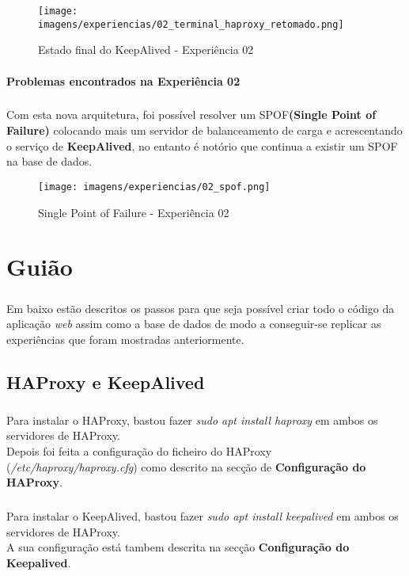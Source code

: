 \documentclass{report}
\begin{document}
\begin{figure}[H]
\center
\texttt{[image: imagens/experiencias/02\_terminal\_haproxy\_retomado.png]}
\caption{Estado final do KeepAlived - Experiência 02}
\label{fig.nav}
\end{figure}

\subsubsection{Problemas encontrados na Experiência 02}
\paragraph{}
Com esta nova arquitetura, foi possível resolver um SPOF\textbf{(Single Point of Failure)} colocando mais um servidor de balanceamento de carga e acrescentando o serviço de \textbf{KeepAlived}, no entanto é notório que continua a existir um SPOF na base de dados.

\begin{figure}[H]
\center
\texttt{[image: imagens/experiencias/02\_spof.png]}
\caption{Single Point of Failure - Experiência 02}
\label{fig.nav}
\end{figure}


\chapter{Guião}\label{Guião}
\paragraph{}
Em baixo estão descritos os passos para que seja possível criar todo o código da aplicação \emph{web} assim como a base de dados de modo a conseguir-se replicar as experiências que foram mostradas anteriormente.

\section{HAProxy e KeepAlived}
\paragraph{}
Para instalar o HAProxy, bastou fazer \emph{sudo apt install haproxy} em ambos os servidores de HAProxy.\\
Depois foi feita a configuração do ficheiro do HAProxy (\emph{/etc/haproxy/haproxy.cfg}) como descrito na secção de \textbf{Configuração do HAProxy}.
\paragraph{}
Para instalar o KeepAlived, bastou fazer \emph{sudo apt install keepalived} em ambos os servidores de HAProxy.\\
A sua configuração está tambem descrita na secção \textbf{Configuração do Keepalived}.
\end{document}
